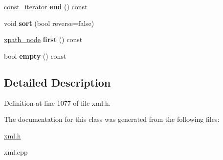 \begin{DoxyCompactItemize}
\item 
\hypertarget{classphys_1_1xml_1_1xpath__node__set_ae22174a98bc75f9fc6af34d1ea4a00da}{
\hyperlink{classphys_1_1xml_1_1xpath__node}{const\_\-iterator} {\bfseries end} () const }
\label{d0/d0a/classphys_1_1xml_1_1xpath__node__set_ae22174a98bc75f9fc6af34d1ea4a00da}

\item 
\hypertarget{classphys_1_1xml_1_1xpath__node__set_ae22d5513bded2cd5b1643e8ac9eb1324}{
void {\bfseries sort} (bool reverse=false)}
\label{d0/d0a/classphys_1_1xml_1_1xpath__node__set_ae22d5513bded2cd5b1643e8ac9eb1324}

\item 
\hypertarget{classphys_1_1xml_1_1xpath__node__set_acb36e645b807dffb3f0a108ba0ea9c47}{
\hyperlink{classphys_1_1xml_1_1xpath__node}{xpath\_\-node} {\bfseries first} () const }
\label{d0/d0a/classphys_1_1xml_1_1xpath__node__set_acb36e645b807dffb3f0a108ba0ea9c47}

\item 
\hypertarget{classphys_1_1xml_1_1xpath__node__set_ae92c5f7b4876c866f1ea8185745e9112}{
bool {\bfseries empty} () const }
\label{d0/d0a/classphys_1_1xml_1_1xpath__node__set_ae92c5f7b4876c866f1ea8185745e9112}

\end{DoxyCompactItemize}


\subsection{Detailed Description}


Definition at line 1077 of file xml.h.



The documentation for this class was generated from the following files:\begin{DoxyCompactItemize}
\item 
\hyperlink{xml_8h}{xml.h}\item 
xml.cpp\end{DoxyCompactItemize}

